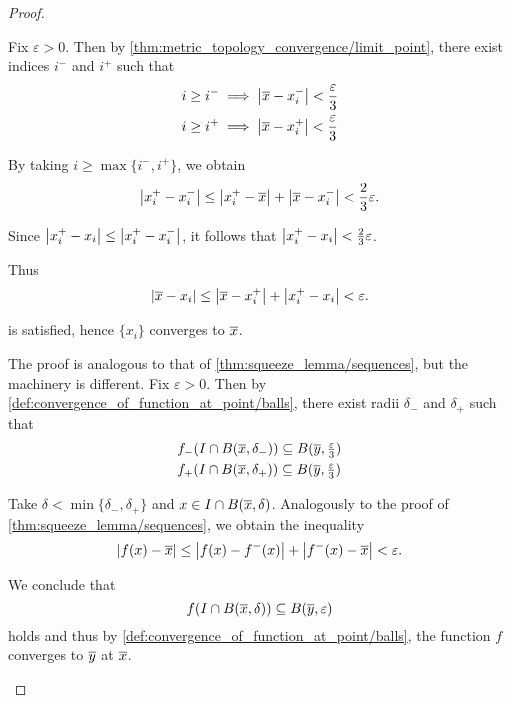 \begin{proof}
  \begin{description}
     Fix \( \varepsilon > 0 \). Then by \cref{thm:metric_topology_convergence/limit_point}, there exist indices \( i^- \) and \( i^+ \) such that
    \begin{align*}
      &i \geq i^- \implies \left\vert \overline{x} - x_i^- \right\vert < \frac \varepsilon 3 \\
      &i \geq i^+ \implies \left\vert \overline{x} - x_i^+ \right\vert < \frac \varepsilon 3
    \end{align*}

    By taking \( i \geq \max \{ i^-, i^+ \} \), we obtain
    \begin{equation*}
      \left\vert x_i^+ - x_i^- \right\vert \leq \left\vert x_i^+ - \overline{x} \right\vert + \left\vert \overline{x} - x_i^- \right\vert < \frac 2 3 \varepsilon.
    \end{equation*}

    Since \( \left\vert x_i^+ - x_i \right\vert \leq \left\vert x_i^+ - x_i^- \right\vert \), it follows that \( \left\vert x_i^+ - x_i \right\vert < \frac 2 3 \varepsilon \).

    Thus
    \begin{equation*}
      \left\vert \overline{x} - x_i \right\vert \leq \left\vert \overline{x} - x_i^+ \right\vert + \left\vert x_i^+ - x_i \right\vert < \varepsilon.
    \end{equation*}

     is satisfied, hence \( \{ x_i \} \) converges to \( \overline{x} \).

     The proof is analogous to that of \cref{thm:squeeze_lemma/sequences}, but the machinery is different. Fix \( \varepsilon > 0 \). Then by \cref{def:convergence_of_function_at_point/balls}, there exist radii \( \delta_- \) and \( \delta_+ \) such that
    \begin{align*}
      &f_-(I \cap B(\overline{x}, \delta_-)) \subseteq B(\overline{y}, \tfrac \varepsilon 3) \\
      &f_+(I \cap B(\overline{x}, \delta_+)) \subseteq B(\overline{y}, \tfrac \varepsilon 3)
    \end{align*}

    Take \( \delta < \min \{ \delta_-, \delta_+ \} \) and \( x \in I \cap B(\overline{x}, \delta) \). Analogously to the proof of \cref{thm:squeeze_lemma/sequences}, we obtain the inequality
    \begin{equation*}
      \left\vert f(x) - \overline{x} \right\vert \leq \left\vert f(x) - f^-(x) \right\vert + \left\vert f^-(x) - \overline{x} \right\vert < \varepsilon.
    \end{equation*}

    We conclude that
    \begin{equation*}
      f(I \cap B(\overline{x}, \delta)) \subseteq B(\overline{y}, \varepsilon)
    \end{equation*}
    holds and thus by \cref{def:convergence_of_function_at_point/balls}, the function \( f \) converges to \( \overline{y} \) at \( \overline{x} \).
  \end{description}
\end{proof}

